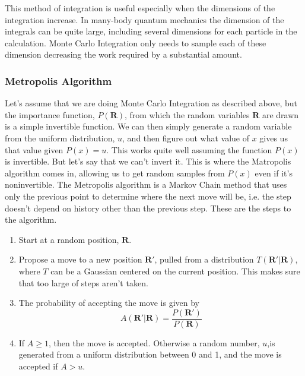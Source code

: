 This method of integration is useful especially when the dimensions of the integration increase. In many-body quantum mechanics the dimension of the integrals can be quite large, including several dimensions for each particle in the calculation. Monte Carlo Integration only needs to sample each of these dimension decreasing the work required by a substantial amount.

\subsubsection{Metropolis Algorithm}
Let's assume that we are doing Monte Carlo Integration as described above, but the importance function, $P(\mathbf{R})$, from which the random variables $\mathbf{R}$ are drawn is a simple invertible function. We can then simply generate a random variable from the uniform distribution, $u$, and then figure out what value of $x$ gives us that value given $P(x)=u$. This works quite well assuming the function $P(x)$ is invertible. But let's say that we can't invert it. This is where the Matropolis algorithm comes in, allowing us to get random samples from $P(x)$ even if it's noninvertible. The Metropolis algorithm is a Markov Chain method that uses only the previous point to determine where the next move will be, i.e. the step doesn't depend on history other than the previous step. These are the steps to the algorithm.
\begin{enumerate}
   \item Start at a random position, $\mathbf{R}$.
   \item Propose a move to a new position $\mathbf{R}'$, pulled from a distribution $T(\mathbf{R}'|\mathbf{R})$, where $T$ can be a Gaussian centered on the current position. This makes sure that too large of steps aren't taken.
   \item The probability of accepting the move is given by
   \begin{equation}
      A(\mathbf{R}'|\mathbf{R}) = \frac{P(\mathbf{R}')}{P(\mathbf{R})}
   \end{equation}
   \item If $A\ge1$, then the move is accepted. Otherwise a random number, $u$,is generated from a uniform distribution between 0 and 1, and the move is accepted if $A>u$.
\end{enumerate}

